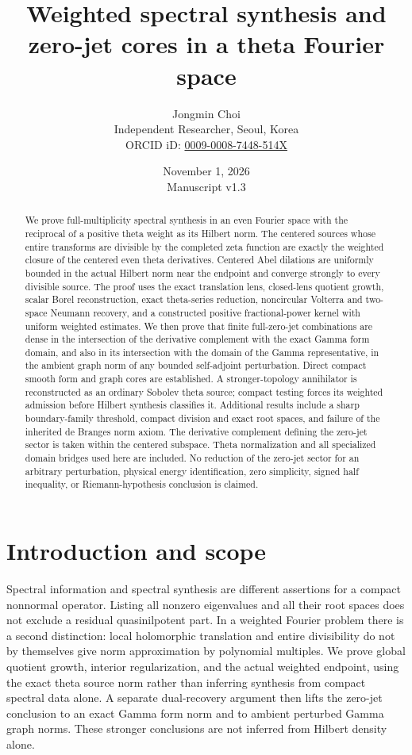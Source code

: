 \documentclass[11pt,a4paper]{article}
\title{Weighted spectral synthesis and zero-jet cores in a theta Fourier space}
\author{Jongmin Choi\\[3pt]\small Independent Researcher, Seoul, Korea\\\small ORCID iD: \href{https://orcid.org/0009-0008-7448-514X}{0009-0008-7448-514X}}
\date{November 1, 2026\\[3pt]\small Manuscript v1.3}
\numberwithin{equation}{section}
\theoremstyle{definition}
\theoremstyle{remark}
\begin{document}
\maketitle
\begin{abstract}
We prove full-multiplicity spectral synthesis in an even Fourier space with the reciprocal of a positive theta weight as its Hilbert norm. The centered sources whose entire transforms are divisible by the completed zeta function are exactly the weighted closure of the centered even theta derivatives. Centered Abel dilations are uniformly bounded in the actual Hilbert norm near the endpoint and converge strongly to every divisible source. The proof uses the exact translation lens, closed-lens quotient growth, scalar Borel reconstruction, exact theta-series reduction, noncircular Volterra and two-space Neumann recovery, and a constructed positive fractional-power kernel with uniform weighted estimates. We then prove that finite full-zero-jet combinations are dense in the intersection of the derivative complement with the exact Gamma form domain, and also in its intersection with the domain of the Gamma representative, in the ambient graph norm of any bounded self-adjoint perturbation. Direct compact smooth form and graph cores are established. A stronger-topology annihilator is reconstructed as an ordinary Sobolev theta source; compact testing forces its weighted admission before Hilbert synthesis classifies it. Additional results include a sharp boundary-family threshold, compact division and exact root spaces, and failure of the inherited de Branges norm axiom. The derivative complement defining the zero-jet sector is taken within the centered subspace. Theta normalization and all specialized domain bridges used here are included. No reduction of the zero-jet sector for an arbitrary perturbation, physical energy identification, zero simplicity, signed half inequality, or Riemann-hypothesis conclusion is claimed.
\end{abstract}

\section{Introduction and scope}

Spectral information and spectral synthesis are different assertions for a compact nonnormal operator. Listing all nonzero eigenvalues and all their root spaces does not exclude a residual quasinilpotent part. In a weighted Fourier problem there is a second distinction: local holomorphic translation and entire divisibility do not by themselves give norm approximation by polynomial multiples. We prove global quotient growth, interior regularization, and the actual weighted endpoint, using the exact theta source norm rather than inferring synthesis from compact spectral data alone. A separate dual-recovery argument then lifts the zero-jet conclusion to an exact Gamma form norm and to ambient perturbed Gamma graph norms. These stronger conclusions are not inferred from Hilbert density alone.
\end{document}
